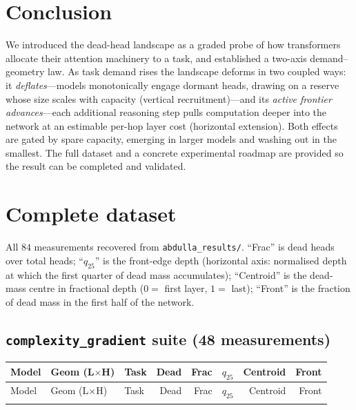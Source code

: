 \documentclass[11pt]{article}
\begin{document}
\section{Conclusion}
We introduced the dead-head landscape as a graded probe of how transformers
allocate their attention machinery to a task, and established a two-axis
demand--geometry law. As task demand rises the landscape deforms in two
coupled ways: it \emph{deflates}---models monotonically engage dormant heads,
drawing on a reserve whose size scales with capacity (vertical
recruitment)---and its \emph{active frontier advances}---each additional
reasoning step pulls computation deeper into the network at an estimable
per-hop layer cost (horizontal extension). Both effects are gated by spare
capacity, emerging in larger models and washing out in the smallest. The full
dataset and a concrete experimental roadmap are provided so the result can be
completed and validated.

\appendix
\section{Complete dataset}\label{app:data}
All $84$ measurements recovered from \texttt{abdulla\_results/}. ``Frac'' is
dead heads over total heads; ``$q_{25}$'' is the front-edge depth (horizontal
axis: normalised depth at which the first quarter of dead mass accumulates);
``Centroid'' is the dead-mass centre in fractional depth ($0=$ first layer,
$1=$ last); ``Front'' is the fraction of dead mass in the first half of the
network.

\subsection{\texttt{complexity\_gradient} suite (48 measurements)}
\small
\begin{longtable}{lllrrrrr}
\toprule
Model & Geom (L$\times$H) & Task & Dead & Frac & $q_{25}$ & Centroid & Front \\
\midrule
\endfirsthead
\toprule
Model & Geom (L$\times$H) & Task & Dead & Frac & $q_{25}$ & Centroid & Front \\
\midrule
\endhead
\bottomrule
\endfoot

\end{longtable}
\end{document}
